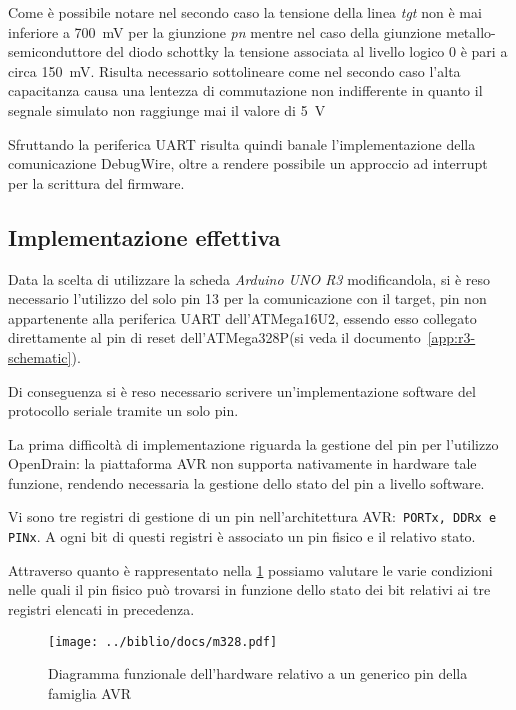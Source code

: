 Come è possibile notare nel secondo caso la tensione della linea \textit{tgt} non è mai inferiore a \SI{700}{\milli\volt} per la giunzione \textit{pn} mentre nel caso della giunzione metallo-semiconduttore del diodo schottky la tensione associata al livello logico 0 è pari a circa \SI{150}{\milli\volt}. Risulta necessario sottolineare come nel secondo caso l'alta capacitanza causa una lentezza di commutazione non indifferente in quanto il segnale simulato non raggiunge mai il valore di \SI{5}{\volt}

Sfruttando la periferica UART risulta quindi banale l'implementazione della comunicazione DebugWire, oltre a rendere possibile un approccio ad interrupt per la scrittura del firmware.

\subsection{Implementazione effettiva}

Data la scelta di utilizzare la scheda \textit{Arduino UNO R3} modificandola, si è reso necessario l'utilizzo del solo pin 13 per la comunicazione con il target, pin non appartenente alla periferica UART dell'ATMega16U2\cite{avr:m16u2}, essendo esso collegato direttamente al pin di reset dell'ATMega328P(si veda il documento~\ref{app:r3-schematic}).

Di conseguenza si è reso necessario scrivere un'implementazione software del protocollo seriale tramite un solo pin.

La prima difficoltà di implementazione riguarda la gestione del pin per l'utilizzo OpenDrain: la piattaforma AVR non supporta nativamente in hardware tale funzione, rendendo necessaria la gestione dello stato del pin a livello software.

Vi sono tre registri di gestione di un pin nell'architettura AVR:\ \texttt{PORTx, DDRx e PINx}. A ogni bit di questi registri è associato un pin fisico e il relativo stato.

Attraverso quanto è rappresentato nella \cref{fig:avr-pin} possiamo valutare le varie condizioni nelle quali il pin fisico può trovarsi in funzione dello stato dei bit relativi ai tre registri elencati in precedenza.

\begin{figure}[t]
    \centering
    \texttt{[image: ../biblio/docs/m328.pdf]}    \caption[Immagine ottenuta dal documento\cite{avr:m16u2}, fig. 12-2]{Diagramma funzionale dell'hardware relativo a un generico pin della famiglia AVR\cite[fig. 12-2]{avr:m16u2}}\label{fig:avr-pin}
\end{figure}

